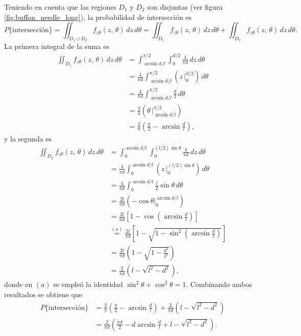 \documentclass[a4paper]{report}
\begin{document}
Teniendo en cuenta que las regiones \(D_1\) y \(D_2\) son disjuntas (ver figura \ref{fig:buffon_needle_long}), la probabilidad de intersección es
\[
 P\{\textrm{intersección}\}=\iint_{D_1\cup D_2}f_{z\theta}(z,\,\theta)\,dz\,d\theta
 =\iint_{D_1}f_{z\theta}(z,\,\theta)\,dz\,d\theta+\iint_{D_2}f_{z\theta}(z,\,\theta)\,dz\,d\theta.
\]
La primera integral de la suma es
\begin{align*}
 \iint_{D_1}f_{z\theta}(z,\,\theta)\,dz\,d\theta&=\int_{\arcsin d/l}^{\pi/2}\int_{0}^{d/2}\frac{4}{\pi d}\,dz\,d\theta\\
 &=\frac{4}{\pi d}\int_{\arcsin d/l}^{\pi/2}\left(z\,\bigg|_{0}^{d/2}\right)\,d\theta\\
 &=\frac{4}{\pi d}\int_{\arcsin d/l}^{\pi/2}\frac{d}{2}\,d\theta\\
 &=\frac{2}{\pi}\left(\theta\,\bigg|_{\arcsin d/l}^{\pi/2}\right)\\
 &=\frac{2}{\pi}\left(\frac{\pi}{2}-\arcsin\frac{d}{l}\right),
\end{align*}
y la segunda es
\begin{align*}
 \iint_{D_2}f_{z\theta}(z,\,\theta)\,dz\,d\theta&=\int_{0}^{\arcsin d/l}\int_{0}^{(l/2)\sin\theta}\frac{4}{\pi d}\,dz\,d\theta\\
 &=\frac{4}{\pi d}\int_{0}^{\arcsin d/l}\left(z\,\bigg|_{0}^{(l/2)\sin\theta}\right)\,d\theta\\
 &=\frac{4}{\pi d}\int_{0}^{\arcsin d/l}\frac{l}{2}\sin\theta\,d\theta\\
 &=\frac{2l}{\pi d}\left(-\cos\theta\bigg|_{0}^{\arcsin d/l}\right)\\
 &=\frac{2l}{\pi d}\left[1-\cos\left(\arcsin\frac{d}{l}\right)\right]\\
 &\overset{(a)}{=}\frac{2l}{\pi d}\left[1-\sqrt{1-\sin^2\left(\arcsin\frac{d}{l}\right)}\right]\\
 &=\frac{2l}{\pi d}\left(1-\sqrt{1-\frac{d^2}{l^2}}\right)\\
 &=\frac{2}{\pi d}\left(l-\sqrt{l^2-d^2}\right),
\end{align*}
donde en \((a)\) se empleó la identidad \(\sin^2\theta+\cos^2\theta=1\).
Combinando ambos resultados se obtiene que
\begin{align*}
 P\{\textrm{intersección}\}&=\frac{2}{\pi}\left(\frac{\pi}{2}-\arcsin\frac{d}{l}\right)+\frac{2}{\pi d}\left(l-\sqrt{l^2-d^2}\right)\\
 &=\frac{2}{\pi d}\left(\frac{\pi d}{2}-d\arcsin\frac{d}{l}+l-\sqrt{l^2-d^2}\right).
\end{align*}
\end{document}

